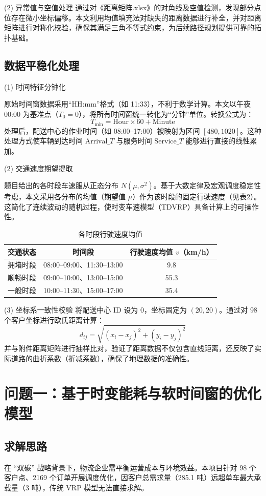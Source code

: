 \documentclass[12pt,a4paper]{article}
\begin{document}
(2) 异常值与空值处理  
通过对《距离矩阵.xlsx》的对角线及空值检测，发现部分点位存在微小坐标偏移。本文利用均值填充法对缺失的距离数据进行补全，并对距离矩阵进行对称化校验，确保其满足三角不等式约束，为后续路径规划提供可靠的拓扑基础。

\subsection{数据平稳化处理}
(1) 时间特征分钟化

原始时间窗数据采用“HH:mm”格式（如 11:33），不利于数学计算。本文以午夜 00:00 为基准点（$T_0 = 0$），将所有时间窗统一转化为“分钟”单位。转换公式为：
\[
T_{\text{min}} = \text{Hour} \times 60 + \text{Minute}
\]
处理后，配送中心的作业时间（如 08:00–17:00）被映射为区间 $[480, 1020]$。这种处理方式使车辆到达时间 $\text{Arrival}\_T$ 与服务时间 $\text{Service}\_T$ 能够进行直接的线性累加。

(2) 交通速度期望提取  

题目给出的各时段车速服从正态分布 $N(\mu, \sigma^2)$。基于大数定律及宏观调度稳定性考虑，本文采用各分布的均值（期望值 $\mu$）作为该时段的固定行驶速度（见表2）。这简化了连续波动的随机过程，使时变车速模型（TDVRP）具备计算上的可操作性。

\begin{table}[H]
\centering
\caption{各时段行驶速度均值}
\begin{tabular}{lcc}
\toprule
交通状态 & 时间段 & 行驶速度均值 $v$（km/h） \\
\midrule
拥堵时段 & 08:00–09:00、11:30–13:00 & 9.8 \\
顺畅时段 & 09:00–10:00、13:00–15:00 & 55.3 \\
一般时段 & 10:00–11:30、15:00–17:00 & 35.4 \\
\bottomrule
\end{tabular}
\end{table}

(3) 坐标系一致性校验  
将配送中心 ID 设为 0，坐标固定为 $(20, 20)$。通过对 98 个客户坐标进行欧氏距离计算：
\[
d_{ij} = \sqrt{(x_i - x_j)^2 + (y_i - y_j)^2}
\]
并与附件距离矩阵进行抽样比对，验证了距离数据不仅包含直线距离，还反映了实际道路的曲折系数（折减系数），确保了地理数据的准确性。
\section{问题一：基于时变能耗与软时间窗的优化模型}
\subsection{求解思路}
在 “双碳” 战略背景下，物流企业需平衡运营成本与环境效益。本项目针对 98 个客户点、2169 个订单开展调度优化，因客户总需求量（285.1 吨）远超单车最大承载量（3 吨），传统 VRP 模型无法直接求解。
\end{document}
